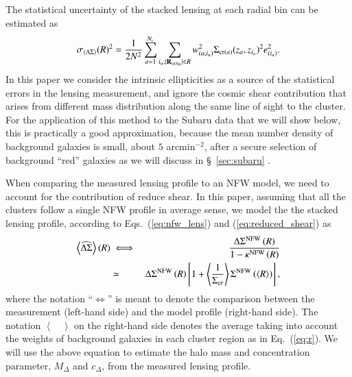 \documentclass[iop, apj]{emulateapj}
\def\ave#1{\left\langle #1 \right\rangle}
\newcommand{\?}{\stackrel{?}{=}}
\begin{document}
The statistical uncertainty of the stacked lensing at each radial bin
can be estimated as
%
\begin{equation}
%
   \sigma_{\ave{\Delta \Sigma}}(R)^2=\frac{1}{2N^2}
   \sum_{a=1}^{N_c}\sum_{i_a; |{\bf R}_{(a)i_a}|\in R} w_{(a,i_a)}^2\Sigma_{{\rm cr}(a)}(z_a,z_{i_a})^2e_{(i_a)}^2.
\label{eq:e_est_dSigma}
\end{equation}
%
In this paper we consider the intrinsic ellipticities as a source of the
statistical errors in the lensing measurement, and ignore the cosmic
shear contribution that arises from different mass distribution along
the same line of sight to the cluster. For the application of this
method to the Subaru data that we will show below,
this is practically
a good approximation, because the mean number density of background
galaxies is small, about $5$ arcmin$^{-2}$, after a secure selection of
background ``red'' galaxies as we will discuss in \S~\ref{sec:subaru}
\citep[also see][for the details]{Okabeetal:13}.

When comparing the measured lensing profile to an NFW model, we need to
account for the contribution of reduce shear.  In this paper, assuming
that all the clusters follow a single NFW profile in average sense, we
model the the stacked lensing profile, according to
Eqs.~(\ref{eq:nfw_lens}) and (\ref{eq:reduced_shear}) as
%
\begin{eqnarray}
 \ave{\widehat{\Delta\Sigma}}(R)&\iff &\frac{\Delta\Sigma^{\rm
  NFW}\left(R\right)}{1-\kappa^{\rm NFW}\left(R\right)}\nonumber\\
  &\simeq& \Delta\Sigma^{\rm
  NFW}\left(R\right)\left[
       1+\ave{\frac{1}{\Sigma_{\rm cr}}}\Sigma^{\rm NFW}\left(\ave{R}\right)
		  \right],
  \label{eq:model_redshear}
\end{eqnarray}
%
where the notation ``$\iff$'' is meant to denote the comparison between
the measurement (left-hand side) and the model profile (right-hand
side).  The notation $\ave{\hspace{1em}}$ on the right-hand side denotes
the average taking into account the weights of background galaxies in
each cluster region as in Eq.~(\ref{eq:r}).  We will use the above
equation to estimate the halo mass and concentration parameter,
$M_\Delta$ and $c_\Delta$, from the measured lensing profile.
\end{document}
